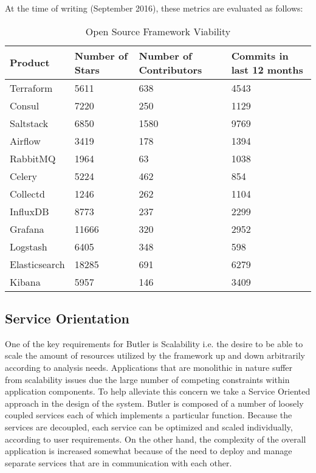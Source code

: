 At the time of writing (September 2016), these metrics are evaluated as follows:

\begin{table}[]
\label{tab:open_source_framework_viability}
\renewcommand{\arraystretch}{1.2} 
\centering
\caption{Open Source Framework Viability}
\begin{tabular}{@{}llll@{}}
\toprule
Product & Number of Stars & Number of Contributors & Commits in last 12 months\\
\midrule
Terraform & 5611 & 638 & 4543 \\
Consul & 7220 & 250 & 1129\\
Saltstack & 6850 & 1580 & 9769 \\
Airflow & 3419 & 178 & 1394\\
RabbitMQ  & 1964 & 63 & 1038\\
Celery & 5224 & 462 & 854\\
Collectd  & 1246 & 262 & 1104\\
InfluxDB & 8773 & 237 & 2299\\
Grafana  & 11666 & 320 & 2952\\
Logstash & 6405 & 348 & 598\\
Elasticsearch & 18285 & 691 & 6279\\
Kibana  & 5957 & 146 & 3409\\
\bottomrule
\end{tabular}
\end{table}

\subsection {Service Orientation}

One of the key requirements for Butler is Scalability i.e. the desire to be able to scale the amount of resources utilized by the framework up and down arbitrarily according to analysis needs. Applications that are monolithic in nature suffer from scalability issues due the large number of competing constraints within application components. To help alleviate this concern we take a Service Oriented approach in the design of the system. Butler is composed of a number of loosely coupled services each of which implements a particular function. Because the services are decoupled, each service can be optimized and scaled individually, according to user requirements. On the other hand, the complexity of the overall application is increased somewhat because of the need to deploy and manage separate services that are in communication with each other.

